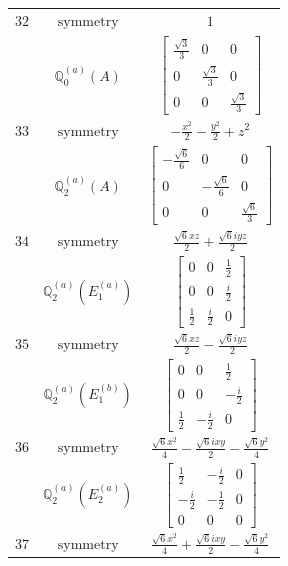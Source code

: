 \documentclass[fleqn,8pt,landscape]{jsarticle}
\begin{document}
\begin{longtable}{ccc}
$ 32 $ & $ \text{symmetry} $ & $ 1 $ \\
$  $ & $ \mathbb{Q}_{0}^{(a)}(A) $ & $ \begin{bmatrix} \frac{\sqrt{3}}{3} & 0 & 0 \\ 0 & \frac{\sqrt{3}}{3} & 0 \\ 0 & 0 & \frac{\sqrt{3}}{3} \end{bmatrix} $ \\ \hline
$ 33 $ & $ \text{symmetry} $ & $ - \frac{x^{2}}{2} - \frac{y^{2}}{2} + z^{2} $ \\
$  $ & $ \mathbb{Q}_{2}^{(a)}(A) $ & $ \begin{bmatrix} - \frac{\sqrt{6}}{6} & 0 & 0 \\ 0 & - \frac{\sqrt{6}}{6} & 0 \\ 0 & 0 & \frac{\sqrt{6}}{3} \end{bmatrix} $ \\ \hline
$ 34 $ & $ \text{symmetry} $ & $ \frac{\sqrt{6} x z}{2} + \frac{\sqrt{6} i y z}{2} $ \\
$  $ & $ \mathbb{Q}_{2}^{(a)}(E_{1}^{(a)}) $ & $ \begin{bmatrix} 0 & 0 & \frac{1}{2} \\ 0 & 0 & \frac{i}{2} \\ \frac{1}{2} & \frac{i}{2} & 0 \end{bmatrix} $ \\ \hline
$ 35 $ & $ \text{symmetry} $ & $ \frac{\sqrt{6} x z}{2} - \frac{\sqrt{6} i y z}{2} $ \\
$  $ & $ \mathbb{Q}_{2}^{(a)}(E_{1}^{(b)}) $ & $ \begin{bmatrix} 0 & 0 & \frac{1}{2} \\ 0 & 0 & - \frac{i}{2} \\ \frac{1}{2} & - \frac{i}{2} & 0 \end{bmatrix} $ \\ \hline
$ 36 $ & $ \text{symmetry} $ & $ \frac{\sqrt{6} x^{2}}{4} - \frac{\sqrt{6} i x y}{2} - \frac{\sqrt{6} y^{2}}{4} $ \\
$  $ & $ \mathbb{Q}_{2}^{(a)}(E_{2}^{(a)}) $ & $ \begin{bmatrix} \frac{1}{2} & - \frac{i}{2} & 0 \\ - \frac{i}{2} & - \frac{1}{2} & 0 \\ 0 & 0 & 0 \end{bmatrix} $ \\ \hline
$ 37 $ & $ \text{symmetry} $ & $ \frac{\sqrt{6} x^{2}}{4} + \frac{\sqrt{6} i x y}{2} - \frac{\sqrt{6} y^{2}}{4} $ \\

\end{longtable}
\end{document}
